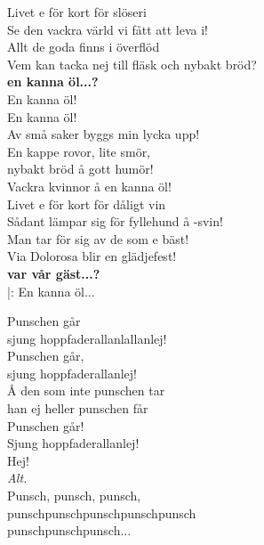 \documentclass[12pt]{article}
\begin{document}
\noindent
\begin{minipage}{0.55\textwidth}
	\noindent
	Livet e för kort för slöseri\\
	Se den vackra värld vi fått att leva i!\\
	Allt de goda finns i överflöd\\
	Vem kan tacka nej till fläsk och nybakt bröd?\\
	\textbf{\small{en kanna öl...?}}\\
	
	\noindent
	En kanna öl!\\
	En kanna öl!\\
	Av små saker byggs min lycka upp!\\
	En kappe rovor, lite smör,\\
	nybakt bröd å gott humör!\\
	Vackra kvinnor å en kanna öl!\\
	
	\noindent
	Livet e för kort för dåligt vin\\
	Sådant lämpar sig för fyllehund å -svin!\\
	Man tar för sig av de som e bäst!\\
	Via Dolorosa blir en glädjefest!\\
	\textbf{\small{var vår gäst...?}}\\
	
	|: En kanna öl...\\
	\vspace{1cm}
	
\end{minipage}%
\hspace{0.05\textwidth}
\noindent
\begin{minipage}{0.4\textwidth}
	\noindent
	Punschen går\\
	sjung hoppfaderallanlallanlej!\\
	Punschen går, \\sjung hoppfaderallanlej!\\
	Å den som inte punschen tar\\
	han ej heller punschen får\\
	Punschen går!\\
	
	\noindent
	Sjung hoppfaderallanlej!\\
	Hej!\\
	
	\noindent
	\textit{Alt.}\\
	Punsch, punsch, punsch,\\
	punschpunschpunschpunschpunsch\\
	punschpunschpunsch...\\
	\vspace{3.5cm}
	
\end{minipage}
\end{document}
